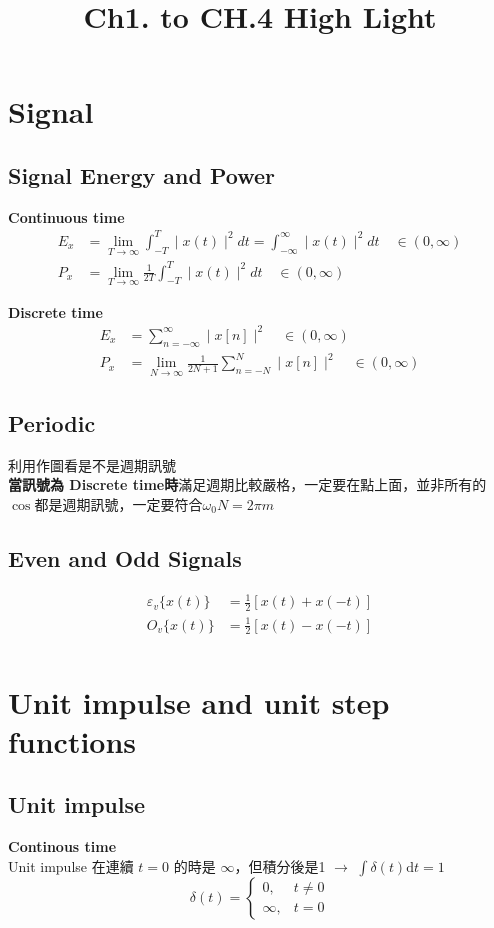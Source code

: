 \documentclass[12pt, a4paper]{article}
\title{Ch1. to CH.4 High Light}
\begin{document}
\section*{Signal}
\subsection*{Signal Energy and Power}
\textbf{Continuous time}
\begin{align*}
	E_x &= \lim_{T \to \infty} \int_{-T}^{T} \mid x(t) \mid^2 dt = \int_{-\infty}^{\infty} \mid x(t) \mid^2 dt \quad \in(0, \infty) \\
	P_x &= \lim_{T \to \infty} \frac{1}{2T} \int_{-T}^{T} \mid x(t) \mid^2 dt \quad \in (0, \infty)
\end{align*}

\textbf{Discrete time}
\begin{align*}
	E_x &= \sum_{n=-\infty}^{\infty} \mid x[n] \mid^2 \quad \in (0, \infty) \\
	P_x &= \lim_{N \to \infty} \frac{1}{2N+1} \sum_{n = -N}^{N} \mid x[n] \mid^2 \quad \in(0, \infty)
\end{align*}

\subsection*{Periodic}
利用作圖看是不是週期訊號 \\
\textbf{當訊號為 Discrete time時}滿足週期比較嚴格，一定要在點上面，\color{red}並非\color{black}所有的$\cos$都是週期訊號，一定要符合$\omega_0N = 2\pi m$

\subsection*{Even and Odd Signals}
\begin{align*}
	\varepsilon_v \{ x(t) \} &= \frac {1}{2} [x(t) + x(-t)] \\
	O_v \{ x(t) \} &= \frac {1}{2} [x(t) - x(-t)] \\
\end{align*}
\newpage

\section*{Unit impulse and unit step functions}
\subsection*{Unit impulse}
\textbf{Continous time} \\
Unit impulse 在連續 $t=0$ 的時是 $\infty$，但積分後是1 $\to$ $\int \delta(t) \text{d}t = 1$
$$
\delta(t) = 
\begin{cases}
0, & t \ne 0 \\
\infty, & t = 0
\end{cases}
$$
\end{document}
